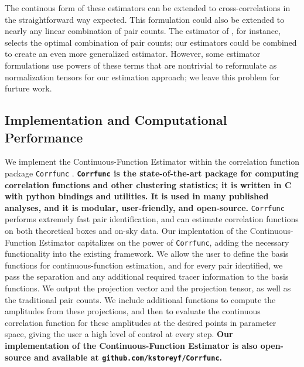 \documentclass[modern]{aastex62}
\newcommand{\est}{the Continuous-Function Estimator\xspace}
\newcommand{\new}[1]{\textbf{#1}}
\begin{document}
The continous form of these estimators can be extended to cross-correlations in the straightforward way expected.
This formulation could also be extended to nearly any linear combination of pair counts.
The estimator of \cite{VargasMagana2013}, for instance, selects the optimal combination of pair counts; our estimators could be combined to create an even more generalized estimator.
However, some estimator formulations use powers of these terms that are nontrivial to reformulate as normalization tensors for our estimation approach; we leave this problem for furture work.

\subsection{Implementation and Computational Performance}
\label{sec:comp}

We implement \est within the correlation function package \texttt{Corrfunc} \citep{Sinha2019}.
\new{\texttt{Corrfunc} is the state-of-the-art package for computing correlation functions and other clustering statistics; it is written in C with python bindings and utilities.
It is used in many published analyses, and it is modular, user-friendly, and open-source.}
\texttt{Corrfunc} performs extremely fast pair identification, and can estimate correlation functions on both theoretical boxes and on-sky data.
Our implentation of \est capitalizes on the power of \texttt{Corrfunc}, adding the necessary functionality into the existing framework.
We allow the user to define the basis functions for continuous-function estimation, and for every pair identified, we pass the separation and any additional required tracer information to the basis functions.
We output the projection vector and the projection tensor, as well as the traditional pair counts.
We include additional functions to compute the amplitudes from these projections, and then to evaluate the continuous correlation function for these amplitudes at the desired points in parameter space, giving the user a high level of control at every step.
\new{Our implementation of \est is also open-source and available at \texttt{github.com/kstoreyf/Corrfunc}.}
\end{document}

